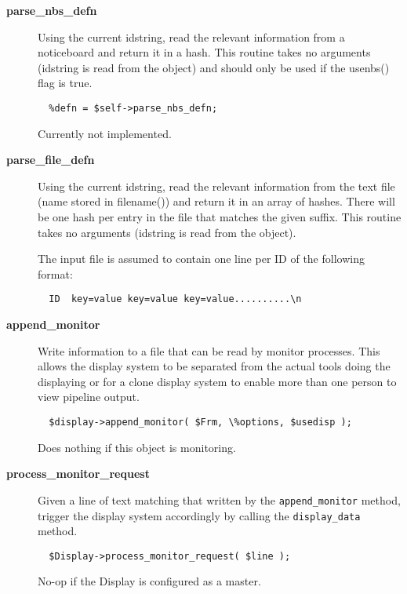 \begin{description}
\item[{\textbf{parse\_nbs\_defn}}] \mbox{}

Using the current idstring, read the relevant information from
a noticeboard and return it in a hash. This routine takes no
arguments (idstring is read from the object) and should only
be used if the usenbs() flag is true.

\begin{verbatim}
  %defn = $self->parse_nbs_defn;
\end{verbatim}


Currently not implemented.


\item[{\textbf{parse\_file\_defn}}] \mbox{}

Using the current idstring, read the relevant information from
the text file (name stored in filename()) and return it in an array
of  hashes. There will be one hash per entry in the file that
matches the given suffix.
This routine takes no arguments (idstring is read from the object).



The input file is assumed to contain one line per ID of the following
format:

\begin{verbatim}
  ID  key=value key=value key=value..........\n
\end{verbatim}

\item[{\textbf{append\_monitor}}] \mbox{}

Write information to a file that can be read by monitor processes. This allows the
display system to be separated from the actual tools doing the displaying or for
a clone display system to enable more than one person to view pipeline output.

\begin{verbatim}
  $display->append_monitor( $Frm, \%options, $usedisp );
\end{verbatim}


Does nothing if this object is monitoring.


\item[{\textbf{process\_monitor\_request}}] \mbox{}

Given a line of text matching that written by the \texttt{append\_monitor} method,
trigger the display system accordingly by calling the \texttt{display\_data} method.

\begin{verbatim}
  $Display->process_monitor_request( $line );
\end{verbatim}


No-op if the Display is configured as a master.

\end{description}
